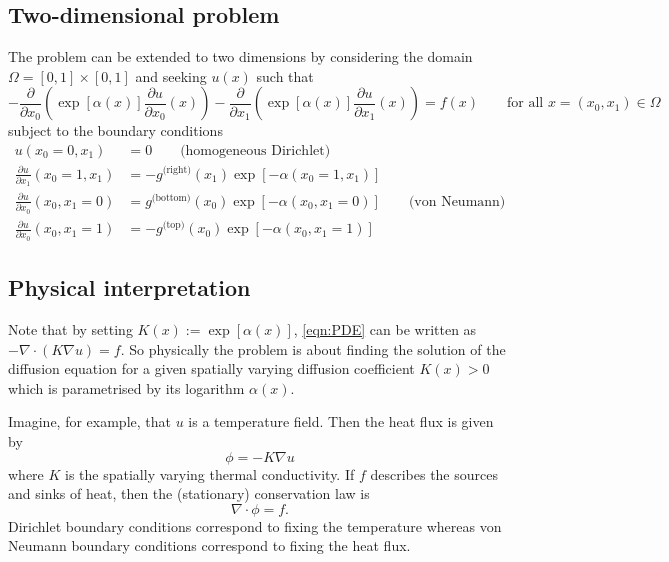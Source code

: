 \documentclass[11pt]{article}
\begin{document}
\subsection{Two-dimensional problem}
The problem can be extended to two dimensions by considering the domain $\Omega=[0,1]\times[0,1]$ and seeking $u(x)$ such that
\begin{equation}
    -\frac{\partial}{\partial x_0}\left(\exp[\alpha(x)]\frac{\partial u}{\partial x_0}(x)\right)-\frac{\partial}{\partial x_1}\left(\exp[\alpha(x)]\frac{\partial u}{\partial x_1}(x)\right) = f(x)\qquad\text{for all $x=(x_0,x_1)\in \Omega$}
    \label{eqn:PDE_2d}
\end{equation}
subject to the boundary conditions 
\begin{equation}
    \begin{aligned}
    u(x_0=0,x_1) &=0 \qquad{\text{(homogeneous Dirichlet)}}\\
    \frac{\partial u}{\partial x_1}(x_0=1,x_1) &=-g^{\text{(right)}}(x_1)\exp[-\alpha(x_0=1,x_1)]\\
    \frac{\partial u}{\partial x_0}(x_0,x_1=0) &=g^{\text{(bottom)}}(x_0)\exp[-\alpha(x_0,x_1=0)] \qquad{\text{(von Neumann)}}\\
    \frac{\partial u}{\partial x_0}(x_0,x_1=1) &=-g^{\text{(top)}}(x_0)\exp[-\alpha(x_0,x_1=1)]
    \end{aligned}
    \label{eqn:boundary_condition_2d}
\end{equation}
\subsection{Physical interpretation}
Note that by setting $K(x):=\exp[\alpha(x)]$, \eqref{eqn:PDE} can be written as $-\nabla\cdot (K\nabla u)=f$. So physically the problem is about finding the solution of the diffusion equation for a given spatially varying diffusion coefficient $K(x)>0$ which is parametrised by its logarithm $\alpha(x)$.

Imagine, for example, that $u$ is a temperature field. Then the heat flux is given by
\begin{equation}
    \phi = - K\nabla u
\end{equation}
where $K$ is the spatially varying thermal conductivity. If $f$ describes the sources and sinks of heat, then the (stationary) conservation law is
\begin{equation}
    \nabla \cdot \phi = f.
\end{equation}
Dirichlet boundary conditions correspond to fixing the temperature whereas von Neumann boundary conditions correspond to fixing the heat flux.
\end{document}
